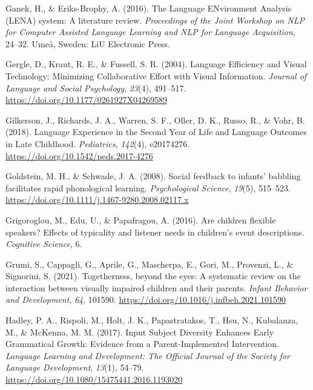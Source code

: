 \documentclass[
  man,floatsintext]{apa6}
\newlength{\cslhangindent}
\newlength{\cslentryspacingunit} %
\newenvironment{CSLReferences}[2] %
 {%
  \setlength{\parindent}{0pt}
  \ifodd #1
  \let\oldpar\par
  \def\par{\hangindent=\cslhangindent\oldpar}
  \fi
  \setlength{\parskip}{#2\cslentryspacingunit}
 }%
 {}
\begin{document}
\begin{CSLReferences}{1}{0}
\leavevmode{}%
Ganek, H., \& Eriks-Brophy, A. (2016). The {Language ENvironment Analysis} ({LENA}) system: {A} literature review. \emph{Proceedings of the Joint Workshop on {NLP} for {Computer Assisted Language Learning} and {NLP} for {Language Acquisition}}, 24--32. {Umeå, Sweden}: {LiU Electronic Press}.

\leavevmode{}%
Gergle, D., Kraut, R. E., \& Fussell, S. R. (2004). Language {Efficiency} and {Visual Technology}: {Minimizing Collaborative Effort} with {Visual Information}. \emph{Journal of Language and Social Psychology}, \emph{23}(4), 491--517. \url{https://doi.org/10.1177/0261927X04269589}

\leavevmode{}%
Gilkerson, J., Richards, J. A., Warren, S. F., Oller, D. K., Russo, R., \& Vohr, B. (2018). Language {Experience} in the {Second Year} of {Life} and {Language Outcomes} in {Late Childhood}. \emph{Pediatrics}, \emph{142}(4), e20174276. \url{https://doi.org/10.1542/peds.2017-4276}

\leavevmode{}%
Goldstein, M. H., \& Schwade, J. A. (2008). Social feedback to infants' babbling facilitates rapid phonological learning. \emph{Psychological Science}, \emph{19}(5), 515--523. \url{https://doi.org/10.1111/j.1467-9280.2008.02117.x}

\leavevmode{}%
Grigoroglou, M., Edu, U., \& Papafragou, A. (2016). Are children flexible speakers? {Effects} of typicality and listener needs in children's event descriptions. \emph{Cognitive Science}, 6.

\leavevmode{}%
Grumi, S., Cappagli, G., Aprile, G., Mascherpa, E., Gori, M., Provenzi, L., \& Signorini, S. (2021). Togetherness, beyond the eyes: {A} systematic review on the interaction between visually impaired children and their parents. \emph{Infant Behavior and Development}, \emph{64}, 101590. \url{https://doi.org/10.1016/j.infbeh.2021.101590}

\leavevmode{}%
Hadley, P. A., Rispoli, M., Holt, J. K., Papastratakos, T., Hsu, N., Kubalanza, M., \& McKenna, M. M. (2017). Input {Subject Diversity Enhances Early Grammatical Growth}: {Evidence} from a {Parent-Implemented Intervention}. \emph{Language Learning and Development: The Official Journal of the Society for Language Development}, \emph{13}(1), 54--79. \url{https://doi.org/10.1080/15475441.2016.1193020}


\end{CSLReferences}
\end{document}
